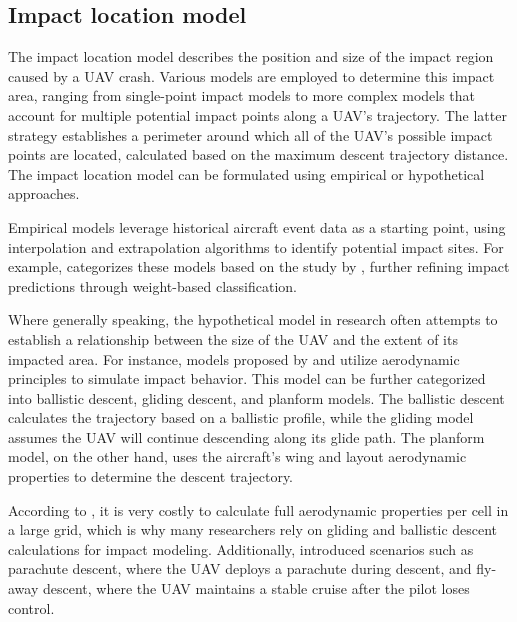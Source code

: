 \documentclass[12pt]{report}
\begin{document}
        \subsection{Impact location model}
            The impact location model describes the position and size of the impact region caused by a UAV crash.
            Various models are employed to determine this impact area, ranging from single-point impact models to more
            complex models that account for multiple potential impact points along a UAV's trajectory. The latter
            strategy establishes a perimeter around which all of the UAV's possible impact points are located,
            calculated based on the maximum descent trajectory distance. The impact location model can be formulated
            using empirical or hypothetical approaches.
                
            Empirical models leverage historical aircraft event data as a starting point, using interpolation and
            extrapolation algorithms to identify potential impact sites. For example, \cite{melnyk_third-party_2014}
            categorizes these models based on the study by \cite{ale_assessment_2000}, further refining impact
            predictions through weight-based classification.
                
            Where generally speaking, the hypothetical model in research often attempts to establish a relationship
            between the size of the UAV and the extent of its impacted area. For instance, models proposed by
            \cite{primatesta_ground_2020} and \cite{burke_system-level_2011} utilize aerodynamic principles to simulate
            impact behavior. This model can be further categorized into ballistic descent, gliding descent, and planform
            models. The ballistic descent calculates the trajectory based on a ballistic profile, while the gliding
            model assumes the UAV will continue descending along its glide path. The planform model, on the other hand,
            uses the aircraft's wing and layout aerodynamic properties to determine the descent trajectory.
                
            According to \cite{primatesta_risk-based_2020}, it is very costly to calculate full aerodynamic properties
            per cell in a large grid, which is why many researchers rely on gliding and ballistic descent calculations
            for impact modeling. Additionally, \cite{primatesta_ground_2020} introduced scenarios such as parachute
            descent, where the UAV deploys a parachute during descent, and fly-away descent, where the UAV maintains a
            stable cruise after the pilot loses control.
                
\end{document}
